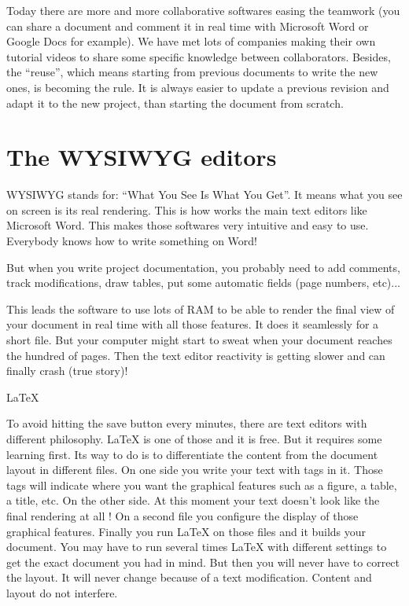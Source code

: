 Today there are more and more collaborative softwares easing the teamwork (you can share a document and comment it in real time with Microsoft Word or Google Docs for example). We have met lots of companies making their own tutorial videos to share some specific knowledge between collaborators. Besides, the “reuse”, which means starting from previous documents to write the new ones, is becoming the rule. It is always easier to update a previous revision and adapt it to the new project, than starting the document from scratch.

\section{The WYSIWYG editors}
WYSIWYG stands for: “What You See Is What You Get”. It means what you see on screen is its real rendering. This is how works the main text editors like Microsoft Word. This makes those softwares very intuitive and easy to use. Everybody knows how to write something on Word!

But when you write project documentation, you probably need to add comments, track modifications, draw tables, put some automatic fields (page numbers, etc)...

This leads the software to use lots of RAM to be able to render the final view of your document in real time with all those features. It does it seamlessly for a short file. But your computer might start to sweat when your document reaches the hundred of pages. Then the text editor reactivity is getting slower and can finally crash (true story)!

\LaTeX{}

To avoid hitting the save button every minutes, there are text editors with different philosophy. LaTeX is one of those and it is free. But it requires some learning first. Its way to do is to differentiate the content from the document layout in different files. On one side you write your text with tags in it. Those tags will indicate where you want the graphical features such as a figure, a table, a title, etc. On the other side. At this moment your text doesn't look like the final rendering at all ! On a second file you configure the display of those graphical features. Finally you run LaTeX on those files and it builds your document. You may have to run several times LaTeX with different settings to get the exact document you had in mind. But then you will never have to correct the layout. It will never change because of a text modification. Content and layout do not interfere.

